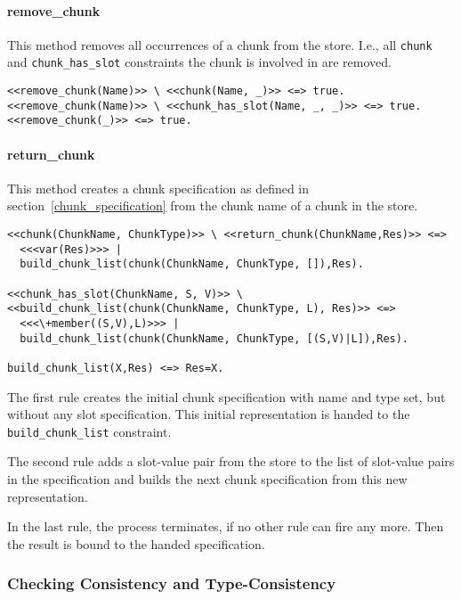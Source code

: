 \paragraph{remove\_chunk}

This method removes all occurrences of a chunk from the store. I.e., all \lstinline|chunk| and \lstinline|chunk_has_slot| constraints the chunk is involved in are removed.

\begin{lstlisting}
<<remove_chunk(Name)>> \ <<chunk(Name, _)>> <=> true.
<<remove_chunk(Name)>> \ <<chunk_has_slot(Name, _, _)>> <=> true.
<<remove_chunk(_)>> <=> true.
\end{lstlisting}

\paragraph{return\_chunk}

This method creates a chunk specification as defined in section~\ref{chunk_specification} from the chunk name of a chunk in the store.

\begin{lstlisting}[caption={rules for \texttt{return\_chunk}}]
<<chunk(ChunkName, ChunkType)>> \ <<return_chunk(ChunkName,Res)>> <=> 
  <<<var(Res)>>> | 
  build_chunk_list(chunk(ChunkName, ChunkType, []),Res).

<<chunk_has_slot(ChunkName, S, V)>> \ <<build_chunk_list(chunk(ChunkName, ChunkType, L), Res)>> <=> 
  <<<\+member((S,V),L)>>> | 
  build_chunk_list(chunk(ChunkName, ChunkType, [(S,V)|L]),Res).
  
build_chunk_list(X,Res) <=> Res=X.
\end{lstlisting}

The first rule creates the initial chunk specification with name and type set, but without any slot specification. This initial representation is handed to the \lstinline|build_chunk_list| constraint.

The second rule adds a slot-value pair from the store to the list of slot-value pairs in the specification and builds the next chunk specification from this new representation.

In the last rule, the process terminates, if no other rule can fire any more. Then the result is bound to the handed specification.

\subsubsection{Checking Consistency and Type-Consistency}

